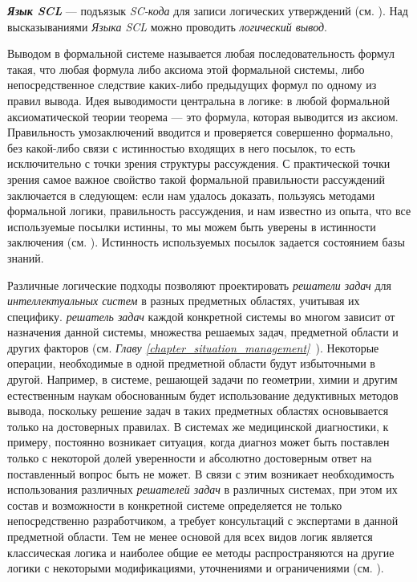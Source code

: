 \textit{\textbf{Язык SCL}} — подъязык \textit{SC-кода} для записи логических утверждений (см. ). Над высказываниями \textit{Языка SCL} можно проводить \textit{логический вывод}.

Выводом в формальной системе называется любая последовательность формул такая, что любая формула либо аксиома этой формальной системы, либо непосредственное следствие каких-либо предыдущих формул по одному из правил вывода. Идея выводимости центральна в логике: в любой формальной аксиоматической теории теорема --- это формула, которая выводится из аксиом. Правильность умозаключений вводится и проверяется совершенно формально, без какой-либо связи с истинностью входящих в него посылок, то есть исключительно с точки зрения структуры рассуждения. С практической точки зрения самое важное свойство такой формальной правильности рассуждений заключается в следующем: если нам удалось доказать, пользуясь методами формальной логики, правильность рассуждения, и нам известно из опыта, что все используемые посылки истинны, то мы можем быть уверены в истинности заключения (см. ). Истинность используемых посылок задается состоянием базы знаний.

Различные логические подходы позволяют проектировать \textit{решатели задач} для \textit{интеллектуальных систем} в разных предметных областях, учитывая их специфику. \textit{решатель задач} каждой конкретной системы во многом зависит от назначения данной системы, множества решаемых задач, предметной области и других факторов (см. \textit{Главу \ref{chapter_situation_management}~}). Некоторые операции, необходимые в одной предметной области будут избыточными в другой. Например, в системе, решающей задачи по геометрии, химии и другим естественным наукам обоснованным будет использование дедуктивных методов вывода, поскольку решение задач в таких предметных областях основывается только на достоверных правилах. В системах же медицинской диагностики, к примеру, постоянно возникает ситуация, когда диагноз может быть поставлен только с некоторой долей уверенности и абсолютно достоверным ответ на поставленный вопрос быть не может. В связи с этим возникает необходимость использования различных \textit{решателей задач} в различных системах, при этом их состав и возможности в конкретной системе определяется не только непосредственно разработчиком, а требует консультаций с экспертами в данной предметной области. Тем не менее основой для всех видов логик является классическая логика и наиболее общие ее методы распространяются на другие логики с некоторыми модификациями, уточнениями и ограничениями (см. ).

